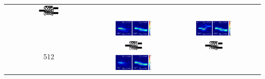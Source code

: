 \begin{landscape}
\begin{table}[ht]
\begin{tabular}{|c|c|c|c|}
      \includegraphics[width=0.24\textwidth]{image/results/wdm/PSO/visualize_eps_disc_256.png} \\
      \cline{2-4}
      &
      \includegraphics[width=0.50\textwidth]{image/results/wdm/PSO/visualize_field_cont_256.png} &
      \includegraphics[width=0.50\textwidth]{image/results/wdm/PSO/visualize_field_disc_256.png} \\
    \hline
      \multirow{2}{*}{512} &
      \includegraphics[width=0.24\textwidth]{image/results/wdm/PSO/visualize_eps_cont_512.png} &
      \includegraphics[width=0.24\textwidth]{image/results/wdm/PSO/visualize_eps_disc_512.png} \\
      \cline{2-4}
      &
      \includegraphics[width=0.50\textwidth]{image/results/wdm/PSO/visualize_field_cont_512.png} &

\end{tabular}
\end{table}
\end{landscape}

